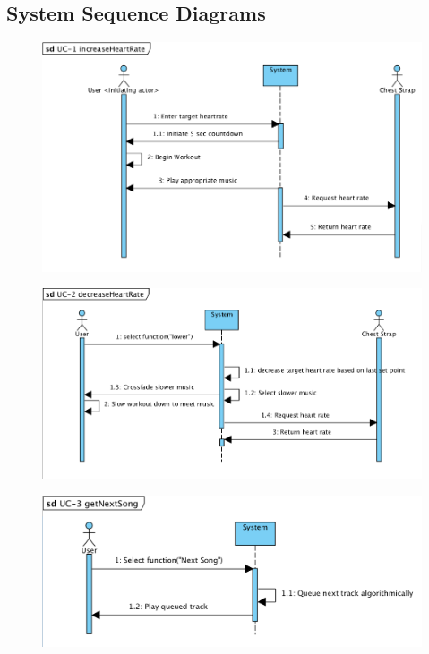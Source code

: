 \documentclass[letterpaper,english, 12pt]{scrreprt}
\begin{document}
\subsection{System Sequence Diagrams}
\begin{figure}[H]
        \centering
        \includegraphics[width=\textwidth]{img/ssd/ssd_uc1.png}\\
\end{figure}

\begin{figure}[H]
        \centering
        \includegraphics[width=\textwidth]{img/ssd/ssd_uc2.png}\\
\end{figure}

\begin{figure}[H]
        \centering
        \includegraphics[width=\textwidth]{img/ssd/ssd_uc3.png}\\
\end{figure}
\end{document}
